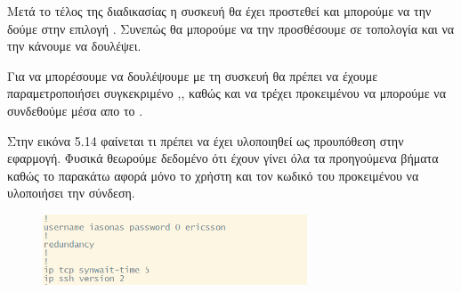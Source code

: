 \FloatBarrier

Μετά το τέλος της διαδικασίας η συσκευή θα έχει προστεθεί και μπορούμε να την δούμε στην επιλογή .
Συνεπώς θα μπορούμε να την προσθέσουμε σε τοπολογία και να την κάνουμε να δουλέψει.

Για να μπορέσουμε να δουλέψουμε με τη συσκευή θα πρέπει να έχουμε παραμετροποιήσει συγκεκριμένο ,, καθώς και να τρέχει 
προκειμένου να μπορούμε να συνδεθούμε μέσα απο το . 

Στην  εικόνα 5.14 φαίνεται τι πρέπει να έχει υλοποιηθεί ως προυπόθεση στην εφαρμογή. Φυσικά θεωρούμε δεδομένο ότι έχουν γίνει όλα τα προηγούμενα βήματα καθώς το παρακάτω αφορά μόνο το χρήστη και τον κωδικό του προκειμένου να υλοποιήσει την  σύνδεση.
\FloatBarrier

\begin{figure}[htb]
	\centering
	\includegraphics[width=0.7\textwidth]{graphics/ssh.png}
	\caption{ }
\end{figure}

\FloatBarrier
